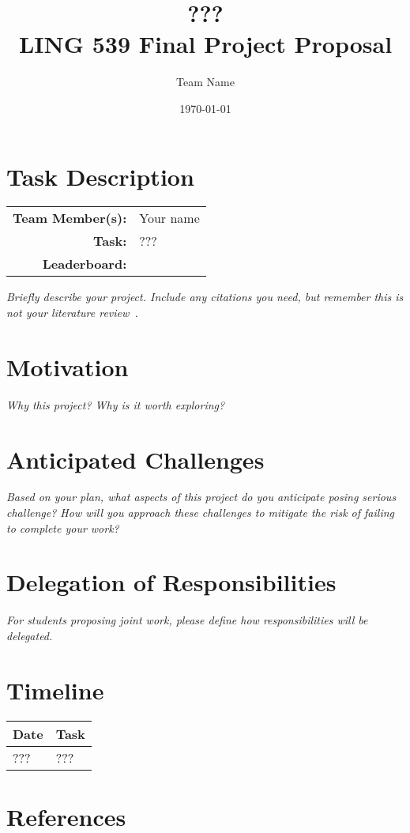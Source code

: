 \documentclass[12pt]{article}
\title{??? \\ {\large LING 539 Final Project Proposal}}
\author{Team Name}
\date{\today}
\begin{document}
\maketitle

\section{Task Description}

\begin{table}[h!]
\begin{tabular}{r l}
	\textbf{Team Member(s):} & Your name \\
	\textbf{Task:} & ??? \\
	\textbf{Leaderboard:} & \url{} \\
\end{tabular}
\end{table}
\textit{Briefly describe your project. Include any citations you need, but remember this is not your literature review~\citep{jurafsky2009speech}.}

\section{Motivation}

\textit{Why this project?  Why is it worth exploring?}

\section{Anticipated Challenges}

\textit{Based on your plan, what aspects of this project do you anticipate posing serious challenge?  How will you approach these challenges to mitigate the risk of failing to complete your work?}

\section{Delegation of Responsibilities}

\textit{For students proposing joint work, please define how responsibilities will be delegated.}

\section{Timeline}

\begin{tabular}{p{0.85in} p{5.5in}}
\toprule
\textbf{Date} & \textbf{Task} \\
\midrule
??? & ??? \\
\end{tabular}

\section{References}
\printbibliography
\end{document}
